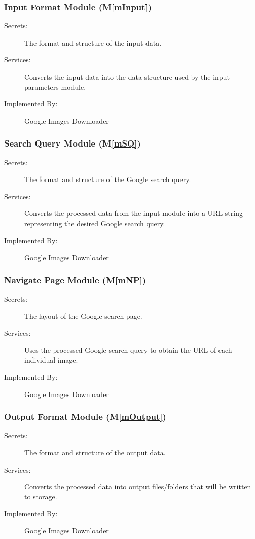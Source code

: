 \documentclass[12pt, titlepage]{article}
\newcommand{\mref}[1]{M\ref{#1}}
\begin{document}
\subsubsection{Input Format Module (\mref{mInput})}

\begin{description}
\item[Secrets:]The format and structure of the input data.
\item[Services:]Converts the input data into the data structure used by the
  input parameters module.
\item[Implemented By:]Google Images Downloader
\end{description}

\subsubsection{Search Query Module (\mref{mSQ})}

\begin{description}
\item[Secrets:]The format and structure of the Google search query.
\item[Services:]Converts the processed data from the input module into a URL string representing the desired Google search query.
\item[Implemented By:]Google Images Downloader
\end{description}

\subsubsection{Navigate Page Module (\mref{mNP})}

\begin{description}
\item[Secrets:]The layout of the Google search page.
\item[Services:]Uses the processed Google search query to obtain the URL of each individual image.
\item[Implemented By:]Google Images Downloader
\end{description}

\subsubsection{Output Format Module (\mref{mOutput})}

\begin{description}
\item[Secrets:]The format and structure of the output data.
\item[Services:]Converts the processed data into output 
files/folders that will be written to storage.
\item[Implemented By:]Google Images Downloader
\end{description}
\end{document}
